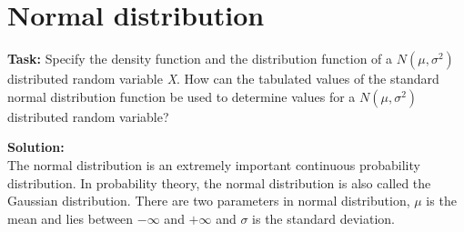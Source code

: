 \section{Normal distribution}
\noindent \textbf{Task:} Specify the density function and the distribution function of a ${N(\mu,\sigma^2)}$ distributed random variable \textit{X}. How can the tabulated values of the standard normal distribution function be used to determine values for a ${N(\mu,\sigma^2)}$ distributed random variable?

\noindent \textbf{Solution:}\\
\noindent The normal distribution is an extremely important continuous probability distribution. In probability theory, the normal distribution is also called the Gaussian distribution. There are two parameters in normal distribution, $\mu$ is the mean and lies between $-\infty$ and $+\infty$ and $\sigma$ is the standard deviation.
 
